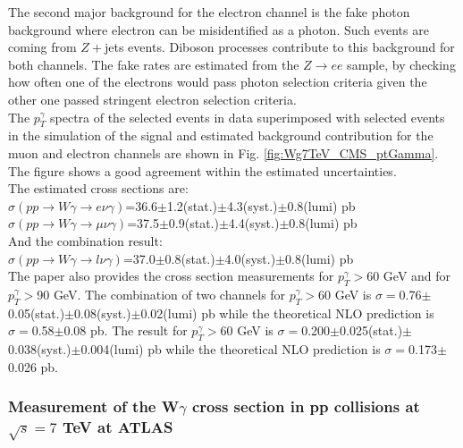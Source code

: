 The second major background for the electron channel is the fake photon background where electron can be misidentified as a photon. Such events are coming from $Z+$jets events. Diboson processes contribute to this background for both channels. The fake rates are estimated from the $Z\rightarrow ee$ sample, by checking how often one of the electrons would pass photon selection criteria given the other one passed stringent electron selection criteria.\\


The $p_T^\gamma$ spectra of the selected events in data superimposed with selected events in the simulation of the signal and estimated background contribution for the muon and electron channels are shown in Fig. \ref{fig:Wg7TeV_CMS_ptGamma}. The figure shows a good agreement within the estimated uncertainties.\\

The estimated cross sections are:\\
$\sigma(pp\rightarrow W\gamma \rightarrow e\nu\gamma)$=36.6$\pm$1.2(stat.)$\pm$4.3(syst.)$\pm$0.8(lumi) pb\\
$\sigma(pp\rightarrow W\gamma \rightarrow \mu\nu\gamma)$=37.5$\pm$0.9(stat.)$\pm$4.4(syst.)$\pm$0.8(lumi) pb\\
And the combination result:\\
$\sigma(pp\rightarrow W\gamma \rightarrow l\nu\gamma)$=37.0$\pm$0.8(stat.)$\pm$4.0(syst.)$\pm$0.8(lumi) pb\\

The paper also provides the cross section measurements for $p_T^\gamma>$60 GeV and for $p_T^\gamma>$90 GeV. The combination of two channels for $p_T^\gamma>$60 GeV is $\sigma=$0.76$\pm$0.05(stat.)$\pm$0.08(syst.)$\pm$0.02(lumi) pb while the theoretical NLO prediction is $\sigma=$0.58$\pm$0.08 pb. The result for $p_T^\gamma>$60 GeV is $\sigma=$0.200$\pm$0.025(stat.)$\pm$0.038(syst.)$\pm$0.004(lumi) pb while the theoretical NLO prediction is $\sigma=$0.173$\pm$0.026 pb.\\


\subsubsection{Measurement of the W$\gamma$ cross section in pp collisions at $\sqrt{s}=7$ TeV at ATLAS}

